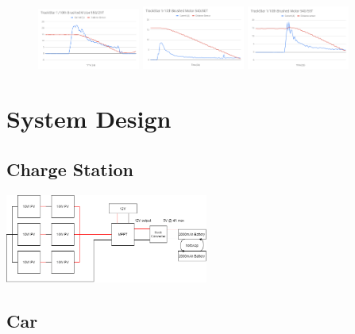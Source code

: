 \documentclass[11pt]{article}
\begin{document}
\begin{figure}[h!]
    \begin{center}
        \includegraphics[width=0.3\textwidth]{inc/large_motor.png}
        \includegraphics[width=0.3\textwidth]{inc/slow_motor.png}
        \includegraphics[width=0.3\textwidth]{inc/small_motor.png}
    \end{center}
\end{figure}

\section{System Design}
\subsection{Charge Station}

\begin{center}
    \includegraphics[width=0.5\textwidth]{inc/panels.png}
\end{center}

\subsection{Car}
\end{document}
